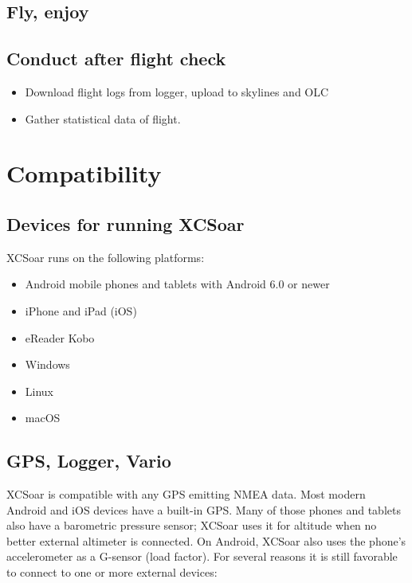 \subsection*{Fly, enjoy}
\vspace{4em}

\subsection*{Conduct after flight check}
\begin{itemize}
\item Download flight logs from logger, upload to skylines and OLC
\item Gather statistical data of flight.
\end{itemize}
\newpage




\section{Compatibility}

\subsection*{Devices for running XCSoar}

XCSoar runs on the following platforms:

\begin{itemize}
\item Android mobile phones and tablets with Android 6.0 or newer
\item iPhone and iPad (iOS)
\item eReader Kobo
\item Windows
\item Linux
\item macOS
\end{itemize}

\subsection*{GPS, Logger, Vario}

XCSoar is compatible with any GPS emitting NMEA data.  Most modern
Android and iOS devices have a built-in GPS.  Many of those phones and
tablets also have a barometric pressure sensor; XCSoar uses it for
altitude when no better external altimeter is connected.  On Android,
XCSoar also uses the phone's accelerometer as a G-sensor (load
factor).  For several reasons it is still favorable to connect to one
or more external devices:

